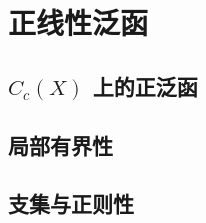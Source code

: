 \section{正线性泛函}
\label{b1:sec:1103}


\subsection{\texorpdfstring{\(C_c(X)\)}{Cc(X)} 上的正泛函}
\label{b1:subsec:110301}

\subsection{局部有界性}
\label{b1:subsec:110302}

\subsection{支集与正则性}
\label{b1:subsec:110303}


